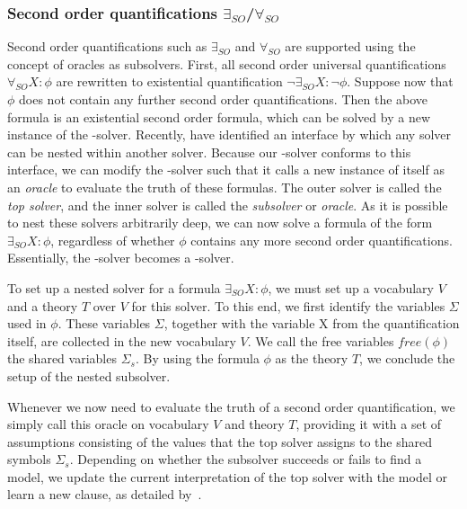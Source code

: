 \subsubsection{Second order quantifications $\exists_{SO}$/$\forall_{SO}$}
Second order quantifications such as $\exists_{SO}$ and $\forall_{SO}$ are supported using the concept of oracles as subsolvers.
First, all second order universal quantifications $\forall_{SO} X : \phi$ are rewritten to existential quantification $\neg \exists_{SO} X : \neg \phi$.
Suppose now that $\phi$ does not contain any further second order quantifications.
Then the above formula is an existential second order formula, which can be solved by a new instance of the \NP-solver.
Recently, \cite{AAAIW1612603} have identified an interface by which any solver can be nested within another solver.
Because our \NP-solver conforms to this interface, we can modify the \NP-solver such that it calls a new instance of itself as an \emph{oracle} to evaluate the truth of these formulas.
The outer solver is called the \emph{top solver}, and the inner solver is called the \emph{subsolver} or \emph{oracle}.
As it is possible to nest these solvers arbitrarily deep, we can now solve a formula of the form $\exists_{SO} X : \phi$, regardless of whether $\phi$ contains any more second order quantifications.
Essentially, the \NP-solver becomes a \QBF-solver.

To set up a nested solver for a formula $\exists_{SO} X : \phi$, we must set up a vocabulary $V$ and a theory $T$ over $V$ for this solver. 
To this end, we first identify the variables $\Sigma$ used in $\phi$.
These variables $\Sigma$, together with the variable X from the quantification itself, are collected in the new vocabulary $V$. 
We call the free variables $\mathit{free}(\phi)$ the shared variables $\Sigma_s$.
By using the formula $\phi$ as the theory $T$, we conclude the setup of the nested subsolver.

Whenever we now need to evaluate the truth of a second order quantification, we simply call this oracle on vocabulary $V$ and theory $T$, providing it with a set of assumptions consisting of the values that the top solver assigns to the shared symbols $\Sigma_s$.
Depending on whether the subsolver succeeds or fails to find a model, we update the current interpretation of the top solver with the model or learn a new clause, as detailed by~\cite{AAAIW1612603}.

